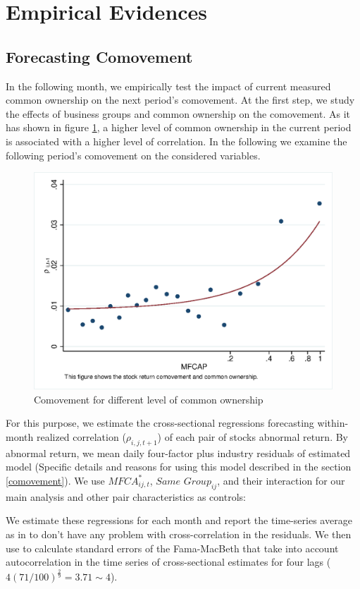 
\section{Empirical Evidences}



\subsection{{Forecasting Comovement}}
\label{Forecasting Comovement}

	In the following month, we empirically test the impact of current measured 	common ownership on the next period’s comovement.
	At the first step, we study the effects of business groups and common ownership on the comovement. As it has shown in figure \ref{mcorr50}, a higher level of common	ownership in the current period is associated with a higher level of correlation. In the following we examine the following period's comovement on the considered variables.
	\begin{figure}[htbp]
	\centering  
	\centering
	\includegraphics[width=0.7\linewidth]{"Output/mcorr50.eps"} 
	\caption{Comovement for different level of common ownership }
	\label{mcorr50}
\end{figure}
	
	For this purpose, we estimate the cross-sectional regressions forecasting within-month realized correlation ($\rho_{i,j,t+1}$) of each pair of stocks abnormal return. By abnormal return, we mean daily four-factor plus industry residuals of estimated model (Specific details and reasons for using this model described in the section \ref{comovement}). We use $\textit{MFCA}^*_{ij,t}$, $\textit{Same Group}_{ij} $, and their interaction for our main analysis and other pair characteristics as controls:
		

	
	We estimate these regressions for each month and report the time-series average as in \cite{FamaMacBeth} to don't have any problem with cross-correlation in the residuals. We then use  \cite{newey1987hypothesis} to calculate standard errors of the Fama-MacBeth that take into account autocorrelation in the time series of cross-sectional estimates for four lags ($ 4(71/100)^{\frac{2}{9}} = 3.71 \sim 4 $).
	
